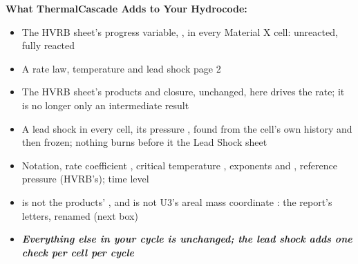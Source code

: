 \documentclass[11pt,addpoints]{exam}
\begin{document}
\begin{tcolorbox}[breakable]
\textbf{What ThermalCascade Adds to Your Hydrocode:}\vspace{.5em}
\begin{itemize}
\item The HVRB sheet's progress variable, \hspace{3mm} \bm{$\lambda$}, \hspace{2mm} in every Material X cell: \hspace{2mm}  unreacted,  fully reacted\vspace{.5em}
\item A rate law, \hspace{3mm} temperature and lead shock \bm{$\rightarrow$} \bm{$\lambda$} \hspace{7mm} page 2\vspace{.5em}
\item The HVRB sheet's products and closure, unchanged, \hspace{3mm}  \hspace{5mm} here  drives the rate; it is no longer only an intermediate result\vspace{.5em}
\item A lead shock in every cell, \hspace{3mm} its pressure , found from the cell's own history and then frozen; \hspace{2mm} nothing burns before it \hspace{7mm} the Lead Shock sheet\vspace{.5em}
\item Notation, \hspace{3mm} rate coefficient , \hspace{2mm} critical temperature , \hspace{2mm} exponents  and , \hspace{2mm} reference pressure  (HVRB's); \hspace{2mm} time level \vspace{.5em}
\item {} is not the products' \bm{$\gamma$}, and  is not U3's areal mass coordinate : \hspace{2mm} the report's letters, renamed (next box)\vspace{.5em}
\item \textbf{\emph{Everything else in your cycle is unchanged; the lead shock adds one check per cell per cycle}}
\end{itemize}
\end{tcolorbox}
\end{document}
